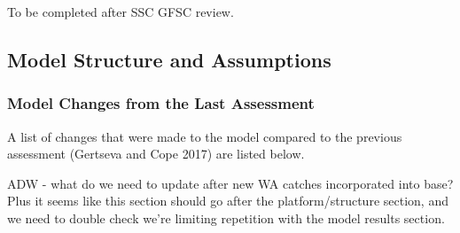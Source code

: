 \documentclass[
]{scrartcl}
\begin{document}
To be completed after SSC GFSC review.

\subsection{Model Structure and
Assumptions}\label{model-structure-and-assumptions}

\subsubsection{Model Changes from the Last
Assessment}\label{sec-changes}

A list of changes that were made to the model compared to the previous
assessment (Gertseva and Cope 2017) are listed below.

ADW - what do we need to update after new WA catches incorporated into
base? Plus it seems like this section should go after the
platform/structure section, and we need to double check we're limiting
repetition with the model results section.
\end{document}
